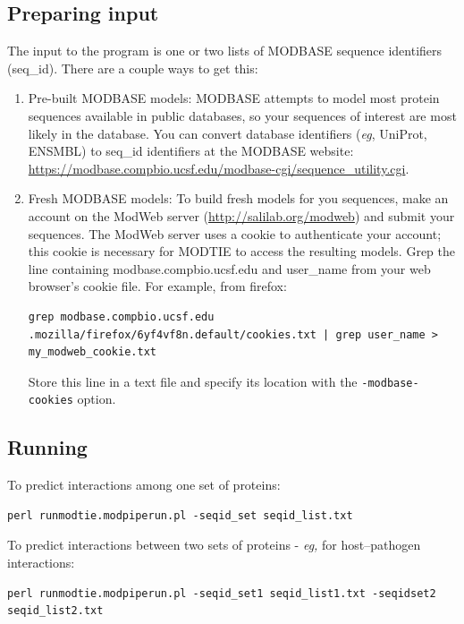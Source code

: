 \documentclass[11pt]{article}
\begin{document}
\subsection{Preparing input}

The input to the program is one or two lists of MODBASE sequence identifiers (seq\_id). There are a couple ways to get this:
\begin{enumerate}
\item Pre-built MODBASE models: MODBASE attempts to model most protein sequences available in public databases, so your sequences of interest are most likely in the database. You can convert database identifiers ({\it eg}, UniProt, ENSMBL) to seq\_id identifiers at the MODBASE website: \url{https://modbase.compbio.ucsf.edu/modbase-cgi/sequence_utility.cgi}.

\item Fresh MODBASE models: To build fresh models for you sequences, make an account on the ModWeb server (\url{http://salilab.org/modweb}) and submit your sequences. The ModWeb server uses a cookie to authenticate your account; this cookie is necessary for MODTIE to access the resulting models. Grep the line containing modbase.compbio.ucsf.edu and user\_name from your web browser's cookie file. For example, from firefox:

\lstset{breaklines=true,language=bash,breakatwhitespace=true}
\lstset{frame=single}
\lstset{basicstyle=\ttfamily}
\begin{lstlisting}
grep modbase.compbio.ucsf.edu .mozilla/firefox/6yf4vf8n.default/cookies.txt | grep user_name > my_modweb_cookie.txt
\end{lstlisting}

Store this line in a text file and specify its location with the {\tt -modbase-cookies} option.
\end{enumerate}

\subsection{Running}

To predict interactions among one set of proteins:

\lstset{breaklines=true,language=bash}
\lstset{frame=single}
\lstset{basicstyle=\ttfamily}
\begin{lstlisting}
perl runmodtie.modpiperun.pl -seqid_set seqid_list.txt
\end{lstlisting}


To predict interactions between two sets of proteins - {\it eg,} for host--pathogen interactions:
\begin{lstlisting}
perl runmodtie.modpiperun.pl -seqid_set1 seqid_list1.txt -seqidset2 seqid_list2.txt
\end{lstlisting}
\end{document}
